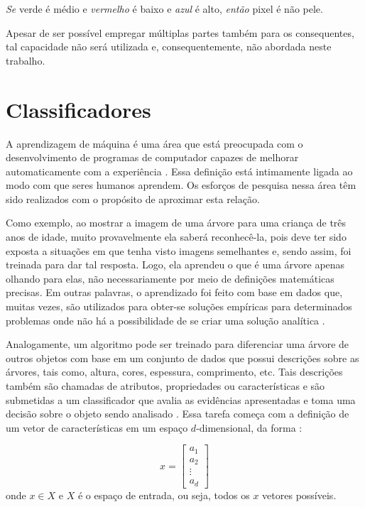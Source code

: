 \begin{exmp}
\label{exp:regra_fuzzy_mult}
\emph{Se} verde é médio e \emph{vermelho} é baixo e \emph{azul} é alto, \emph{então} pixel é não pele.
\end{exmp}

Apesar de ser possível empregar múltiplas partes também para os consequentes, tal capacidade não será utilizada e, consequentemente, não abordada neste trabalho.


\section{Classificadores}
\label{sec:classificadores}
A aprendizagem de máquina é uma área que está preocupada com o desenvolvimento de programas de computador capazes de melhorar automaticamente com a experiência \citep{mitchell:97}. Essa definição está intimamente ligada ao modo com que seres humanos aprendem. Os esforços de pesquisa nessa área têm sido realizados com o propósito de aproximar esta relação.

Como exemplo, ao mostrar a imagem de uma árvore para uma criança de três anos de idade, muito provavelmente ela saberá reconhecê-la, pois deve ter sido exposta a situações em que tenha visto imagens semelhantes e, sendo assim, foi treinada para dar tal resposta. Logo, ela aprendeu o que é uma árvore apenas olhando para elas, não necessariamente por meio de definições matemáticas precisas. Em outras palavras, o aprendizado foi feito com base em dados que, muitas vezes, são utilizados para obter-se soluções empíricas para determinados problemas onde não há a possibilidade de se criar uma solução analítica \citep{mostafa:12}.

Analogamente, um algoritmo pode ser treinado para diferenciar uma árvore de outros objetos com base em um conjunto de dados que possui descrições sobre as árvores, tais como, altura, cores, espessura, comprimento, etc. Tais descrições também são chamadas de atributos, propriedades ou características e são submetidas a um classificador que avalia as evidências apresentadas e toma uma decisão sobre o objeto sendo analisado \citep{duda:12}. Essa tarefa começa com a definição de um vetor de características em um espaço $d$-dimensional, da forma \citep{duda:12}:

\begin{equation}
\label{eq:vetor_caracteristicas}
  x = 
  \begin{bmatrix}
    a_1 \\ a_2 \\ \vdots \\ a_d
  \end{bmatrix}
\end{equation}
\noindent onde $x \in X$ e $X$ é o espaço de entrada, ou seja, todos os $x$ vetores possíveis.

